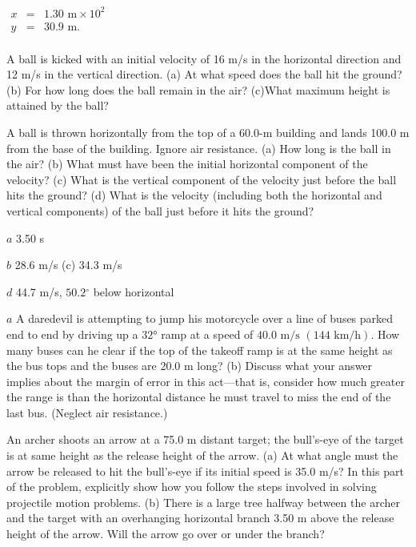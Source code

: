 \documentclass[
]{book}
\begin{document}
\leavevmode{}%
\(\begin{array}{lll} x & = & {\text{1.30\ m} \times 10^{2}} \\ y & = & {\text{30}\text{.9\ m.}} \\ \end{array}\)

\hypertarget{fs-id1275043}{}
\leavevmode{}%
A ball is kicked with an initial velocity of 16 m/s in the horizontal
direction and 12 m/s in the vertical direction. (a) At what speed does
the ball hit the ground? (b) For how long does the ball remain in the
air? (c)What maximum height is attained by the ball?

\hypertarget{fs-id2889503}{}
\leavevmode{}%
A ball is thrown horizontally from the top of a 60.0-m building and
lands 100.0 m from the base of the building. Ignore air resistance. (a)
How long is the ball in the air? (b) What must have been the initial
horizontal component of the velocity? (c) What is the vertical component
of the velocity just before the ball hits the ground? (d) What is the
velocity (including both the horizontal and vertical components) of the
ball just before it hits the ground?

\leavevmode{}%
\(a\) 3.50 s

\(b\) 28.6 m/s (c) 34.3 m/s

\(d\) 44.7 m/s, \(50.2{^\circ}\) below horizontal

\hypertarget{fs-id2197387}{}
\leavevmode{}%
\(a\) A daredevil is attempting to jump his motorcycle over a line of
buses parked end to end by driving up a \(\text{32°}{}\) ramp at a speed
of \({\text{40}\text{.}\text{0~m/s~}(\text{144~km/h})}{}\). How many buses
can he clear if the top of the takeoff ramp is at the same height as the
bus tops and the buses are 20.0 m long? (b) Discuss what your answer
implies about the margin of error in this act---that is, consider how
much greater the range is than the horizontal distance he must travel to
miss the end of the last bus. (Neglect air resistance.)

\hypertarget{fs-id1420192}{}
\leavevmode{}%
An archer shoots an arrow at a 75.0 m distant target; the bull's-eye of
the target is at same height as the release height of the arrow. (a) At
what angle must the arrow be released to hit the bull's-eye if its
initial speed is 35.0 m/s? In this part of the problem, explicitly show
how you follow the steps involved in solving projectile motion problems.
(b) There is a large tree halfway between the archer and the target with
an overhanging horizontal branch 3.50 m above the release height of the
arrow. Will the arrow go over or under the branch?
\end{document}
